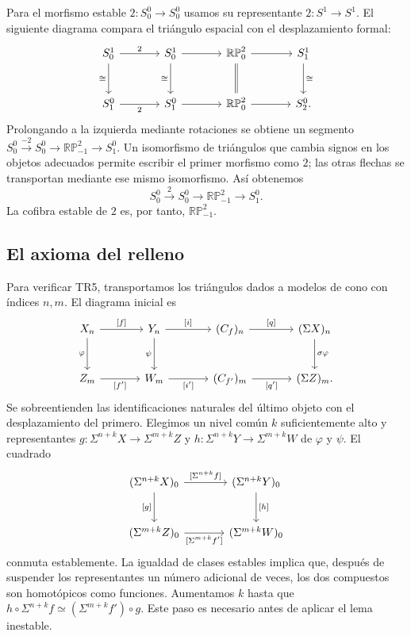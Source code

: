 \begin{ejem}
Para el morfismo estable $2\colon S^0_0\to S^0_0$ usamos su representante $2\colon S^1\to S^1$. El siguiente diagrama compara el triángulo espacial con el desplazamiento formal:
\[
\begin{tikzcd}[column sep=large,row sep=large]
S^1_0 \arrow[r,"2"] \arrow[d,"\cong"'] & S^1_0 \arrow[r] \arrow[d,"\cong"'] & \mathbb{RP}^2_0 \arrow[r] \arrow[d,equal] & S^1_1 \arrow[d,"\cong"]\\
S^0_1 \arrow[r,"2"'] & S^0_1 \arrow[r] & \mathbb{RP}^2_0 \arrow[r] & S^0_2.
\end{tikzcd}
\]
Prolongando a la izquierda mediante rotaciones se obtiene un segmento $S^0_0\xrightarrow{-2}S^0_0\to\mathbb{RP}^2_{-1}\to S^0_1$. Un isomorfismo de triángulos que cambia signos en los objetos adecuados permite escribir el primer morfismo como $2$; las otras flechas se transportan mediante ese mismo isomorfismo. Así obtenemos
\[
S^0_0\xrightarrow{2}S^0_0\longrightarrow\mathbb{RP}^2_{-1}\longrightarrow S^0_1.
\]
La cofibra estable de $2$ es, por tanto, $\mathbb{RP}^2_{-1}$.
\end{ejem}

\subsection{El axioma del relleno}
Para verificar \textup{TR5}, transportamos los triángulos dados a modelos de cono con índices $n,m$. El diagrama inicial es
\[
\begin{tikzcd}[column sep=large,row sep=large]
X_n \arrow[r,"{[f]}"] \arrow[d,"\varphi"'] & Y_n \arrow[r,"{[i]}"] \arrow[d,"\psi"'] & (C_f)_n \arrow[r,"{[q]}"] & (\Sigma X)_n \arrow[d,"\sigma\varphi"]\\
Z_m \arrow[r,"{[f']}"'] & W_m \arrow[r,"{[i']}"'] & (C_{f'})_m \arrow[r,"{[q']}"'] & (\Sigma Z)_m.
\end{tikzcd}
\]
Se sobreentienden las identificaciones naturales del último objeto con el desplazamiento del primero. Elegimos un nivel común $k$ suficientemente alto y representantes $g\colon\Sigma^{n+k}X\to\Sigma^{m+k}Z$ y $h\colon\Sigma^{n+k}Y\to\Sigma^{m+k}W$ de $\varphi$ y $\psi$. El cuadrado
\[
\begin{tikzcd}[column sep=large,row sep=large]
(\Sigma^{n+k}X)_0 \arrow[r,"{[\Sigma^{n+k}f]}"] \arrow[d,"{[g]}"'] & (\Sigma^{n+k}Y)_0 \arrow[d,"{[h]}"]\\
(\Sigma^{m+k}Z)_0 \arrow[r,"{[\Sigma^{m+k}f']}"'] & (\Sigma^{m+k}W)_0
\end{tikzcd}
\]
conmuta establemente. La igualdad de clases estables implica que, después de suspender los representantes un número adicional de veces, los dos compuestos son homotópicos como funciones. Aumentamos $k$ hasta que
$h\circ\Sigma^{n+k}f\simeq(\Sigma^{m+k}f')\circ g$. Este paso es necesario antes de aplicar el lema inestable.

